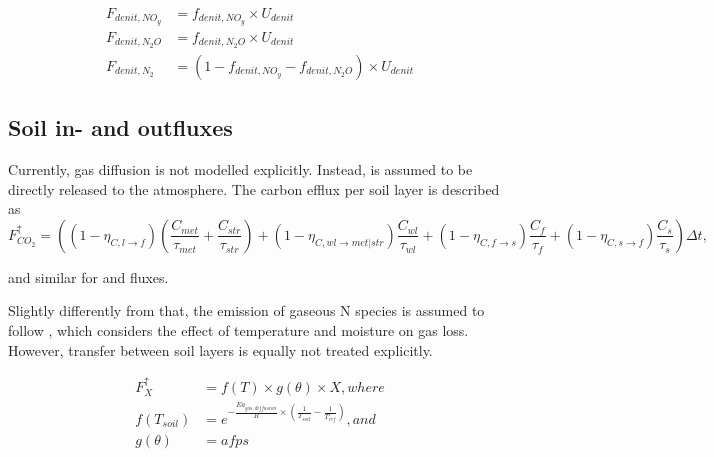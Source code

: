 \begin{subequations}\label{eq:sb:simple_dynamic_denitrification_prod}
\begin{align}
F_{denit,NO_y} &= f_{denit,NO_y}  \times U_{denit}\\
F_{denit,N_2O} &= f_{denit,N_2O}  \times U_{denit}\\
F_{denit,N_2} &= (1 - f_{denit,NO_y} - f_{denit,N_2O})  \times U_{denit}
\end{align}
\end{subequations}
 
\subsection{Soil in- and outfluxes}\label{sec:sb:simple_netbalance}

Currently, gas diffusion is not modelled explicitly. Instead,  is assumed to be directly released to the atmosphere. The carbon efflux per soil layer is described as 
\begin{equation}
F^{\uparrow}_{CO_2} = ( (1-\eta_{C,l \rightarrow f}) (\frac{C_{met}}{\tau_{met}} + \frac{C_{str}}{\tau_{str}}) + (1 - \eta_{C,wl \rightarrow met|str}) \frac{C_{wl}}{\tau_{wl}} + (1 - \eta_{C,f \rightarrow s}) \frac{C_{f}}{\tau_{f}} + (1 - \eta_{C,s \rightarrow f}) \frac{C_{s}}{\tau_{s}} ) \Delta t,
\end{equation} 

and similar for  and  fluxes.

Slightly differently from that, the emission of gaseous N species is assumed to follow \cite{XURI:2008jq}, which considers the effect of temperature and moisture on gas loss. However, transfer between soil layers is equally not treated explicitly. 

\begin{subequations}\label{eq:sb:simple_ngasloss}
\begin{align}
F^{\uparrow}_{X} &= f(T) \times g(\theta) \times X, where \\
f(T_{soil}) &= e^{-\frac{Ea_{gas,diffusion}}{R} \times (\frac{1}{T_{soil}} - \frac{1}{T^{\tau}_{ref}})}, and \\
g(\theta) &= afps 
\end{align}
\end{subequations}





